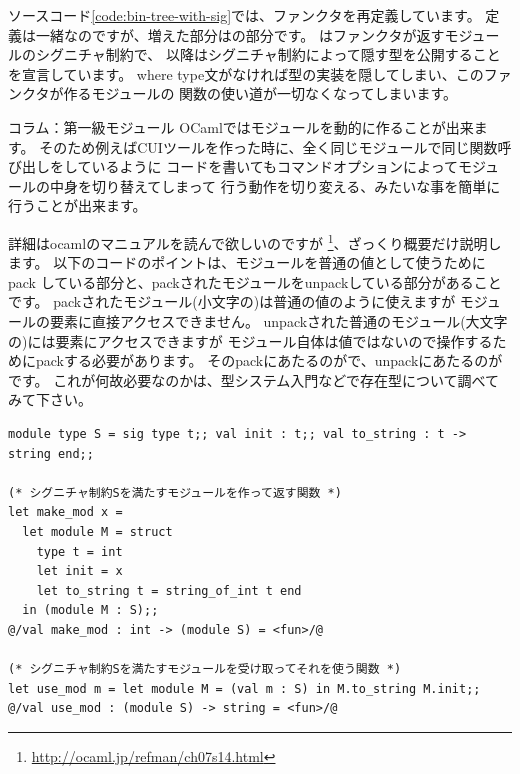\documentclass[11pt,a4paper]{article}
\begin{document}
ソースコード\ref{code:bin-tree-with-sig}では、ファンクタを再定義しています。
定義は一緒なのですが、増えた部分はの部分です。
はファンクタが返すモジュールのシグニチャ制約で、
以降はシグニチャ制約によって隠す型を公開することを宣言しています。
where type文がなければ型の実装を隠してしまい、このファンクタが作るモジュールの
関数の使い道が一切なくなってしまいます。

\begin{itembox}[l]{コラム：第一級モジュール}
OCaml\cite{ocaml}ではモジュールを動的に作ることが出来ます。
そのため例えばCUIツールを作った時に、全く同じモジュールで同じ関数呼び出しをしているように
コードを書いてもコマンドオプションによってモジュールの中身を切り替えてしまって
行う動作を切り変える、みたいな事を簡単に行うことが出来ます。

詳細はocamlのマニュアルを読んで欲しいのですが
\footnote{\url{http://ocaml.jp/refman/ch07s14.html}}、ざっくり概要だけ説明します。
以下のコードのポイントは、モジュールを普通の値として使うためにpack
している部分と、packされたモジュールをunpackしている部分があることです。
packされたモジュール(小文字の)は普通の値のように使えますが
モジュールの要素に直接アクセスできません。
unpackされた普通のモジュール(大文字の)には要素にアクセスできますが
モジュール自体は値ではないので操作するためにpackする必要があります。
そのpackにあたるのがで、unpackにあたるのがです。
これが何故必要なのかは、型システム入門などで存在型について調べてみて下さい。

\begin{lstlisting}[caption=第一級モジュール モジュールを作る関数と使う関数]
module type S = sig type t;; val init : t;; val to_string : t -> string end;;

(* シグニチャ制約Sを満たすモジュールを作って返す関数 *)
let make_mod x =
  let module M = struct
    type t = int
    let init = x
    let to_string t = string_of_int t end
  in (module M : S);;
@/val make_mod : int -> (module S) = <fun>/@

(* シグニチャ制約Sを満たすモジュールを受け取ってそれを使う関数 *)
let use_mod m = let module M = (val m : S) in M.to_string M.init;;
@/val use_mod : (module S) -> string = <fun>/@
\end{lstlisting}
\end{itembox}
\end{document}
